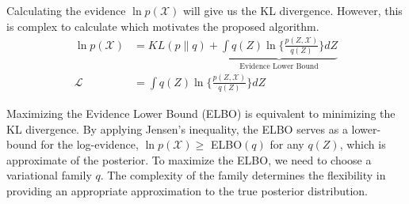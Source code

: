 \documentclass[letterpaper]{article}
\begin{document}
Calculating the evidence $\ln p(\mathcal{X})$ will give us the KL divergence. However, this is complex to calculate which motivates the proposed algorithm. 
\begin{align}
    \ln p(\mathcal{X}) &= KL(p\parallel q) + \underbrace{\int q(Z) \ln\{\frac{p(Z,\mathcal{X})}{q(Z)}\}dZ}_\text{Evidence Lower Bound}\\
    \mathcal{L} &= \int q(Z) \ln\{\frac{p(Z,\mathcal{X})}{q(Z)}\}dZ
\end{align}

Maximizing the Evidence Lower Bound (ELBO) is equivalent to minimizing the KL divergence. 
By applying Jensen's inequality, the ELBO serves as a lower-bound for the log-evidence, $\ln p(\mathcal{X}) \geq$ ELBO$(q)$ for any $q(Z)$, which is approximate of the posterior.  
To maximize the ELBO, we need to choose a variational family $q$.
The complexity of the family determines the flexibility in providing an appropriate approximation to the true posterior distribution.



\end{document}
